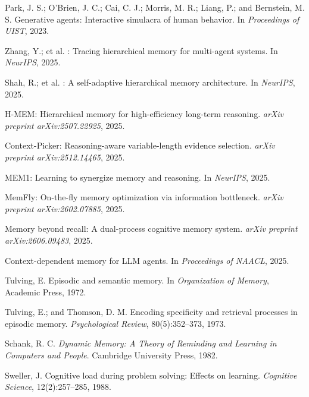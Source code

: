 \documentclass[UTF8,twocolumn]{ctexart}
\begin{document}
\begin{thebibliography}{}
Park, J. S.; O'Brien, J. C.; Cai, C. J.; Morris, M. R.; Liang, P.; and Bernstein, M. S.
\newblock Generative agents: Interactive simulacra of human behavior.
\newblock In \emph{Proceedings of UIST}, 2023.

Zhang, Y.; et al.
: Tracing hierarchical memory for multi-agent systems.
\newblock In \emph{NeurIPS}, 2025.

Shah, R.; et al.
: A self-adaptive hierarchical memory architecture.
\newblock In \emph{NeurIPS}, 2025.

{H-MEM}: Hierarchical memory for high-efficiency long-term reasoning.
\newblock \emph{arXiv preprint arXiv:2507.22925}, 2025.

{Context-Picker}: Reasoning-aware variable-length evidence selection.
\newblock \emph{arXiv preprint arXiv:2512.14465}, 2025.

{MEM1}: Learning to synergize memory and reasoning.
\newblock In \emph{NeurIPS}, 2025.

{MemFly}: On-the-fly memory optimization via information bottleneck.
\newblock \emph{arXiv preprint arXiv:2602.07885}, 2025.

Memory beyond recall: A dual-process cognitive memory system.
\newblock \emph{arXiv preprint arXiv:2606.09483}, 2025.

Context-dependent memory for {LLM} agents.
\newblock In \emph{Proceedings of NAACL}, 2025.

Tulving, E.
\newblock Episodic and semantic memory.
\newblock In \emph{Organization of Memory}, Academic Press, 1972.

Tulving, E.; and Thomson, D. M.
\newblock Encoding specificity and retrieval processes in episodic memory.
\newblock \emph{Psychological Review}, 80(5):352--373, 1973.

Schank, R. C.
\newblock \emph{Dynamic Memory: A Theory of Reminding and Learning in Computers and People}.
\newblock Cambridge University Press, 1982.

Sweller, J.
\newblock Cognitive load during problem solving: Effects on learning.
\newblock \emph{Cognitive Science}, 12(2):257--285, 1988.


\end{thebibliography}
\end{document}
